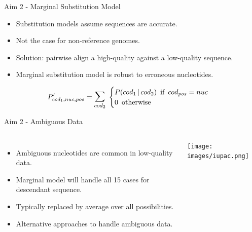 \documentclass{beamer}
\begin{document}
\begin{frame}{Aim 2 - Marginal Substitution Model} %
\begin{itemize}
	\setlength\itemsep{1em}
	\item Substitution models assume sequences are accurate.
	\item Not the case for non-reference genomes.
	\item Solution: pairwise align a high-quality against a low-quality sequence.
	\item Marginal substitution model is robust to erroneous nucleotides.
\end{itemize}
\vspace{2em}

\[P'_{cod_1,nuc,pos} = \mathlarger{\mathlarger{\sum}}_{cod_2} \thickspace \begin{cases}
	P(cod_1 \thinspace | \thinspace cod_2) \enspace \text{if} \enspace cod_{pos} = nuc\\
	0 \enspace \text{otherwise}
\end{cases} \]

\end{frame} %

\begin{frame}{Aim 2 - Ambiguous Data} %
\begin{columns}
\begin{itemize}
	\setlength\itemsep{1em}
	\item Ambiguous nucleotides are common in low-quality data.
	\item Marginal model will handle all 15 cases for descendant sequence.
	\item Typically replaced by average over all possibilities.
	\item Alternative approaches to handle ambiguous data.
\end{itemize}
\texttt{[image: images/iupac.png]}
\end{columns}
\end{frame} %
\end{document}
